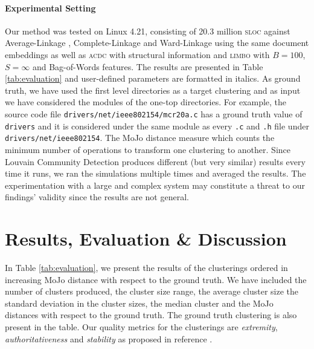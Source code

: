 \documentclass[sigconf,review, anonymous]{acmart}
\begin{document}
\paragraph{Experimental Setting} Our method was tested on Linux 4.21,
consisting of 20.3 million \textsc{sloc} against Average-Linkage \cite{average}, Complete-Linkage \cite{complete} 
and Ward-Linkage \cite{ward} using the same document embeddings
as well as \textsc{acdc} with structural information \cite{acdc} and \textsc{limbo} \cite{limbo} with $B = 100$, $S = \infty$ and Bag-of-Words features. The results are presented in Table \ref{tab:evaluation} and user-defined parameters are formatted in italics. 
As ground truth, we have used the first level directories as a target clustering and as input we have considered 
the modules of the one-top directories. 
For example, the source code file \texttt{drivers/net/ieee802154\-/mcr20a.c} has a ground truth value of \texttt{drivers} 
and it is considered under the same module as every \texttt{.c} and \texttt{.h} file under \texttt{drivers/net/ieee802154}. 
The MoJo distance measure which counts the minimum number of operations to transform one clustering to another.  
Since Louvain Community Detection produces  different (but very similar) results every time it runs, we ran the simulations 
multiple times and averaged the results. 
The experimentation with a large and complex system may constitute a threat to our findings' validity since the results are not general.  


\section{Results, Evaluation \& Discussion}

In Table \ref{tab:evaluation}, we present the results of the clusterings ordered in increasing MoJo distance 
with respect to the ground truth. 
We have included the number of clusters produced, the cluster size range, the average cluster size the standard
deviation in the cluster sizes, the median cluster and the MoJo distances with respect to the ground truth. 
The ground truth clustering is also present in the table. 
Our quality metrics for the clusterings are 
\emph{extremity}, \emph{authoritativeness} and \emph{stability} as proposed in reference \cite{evaluation}.
\end{document}
